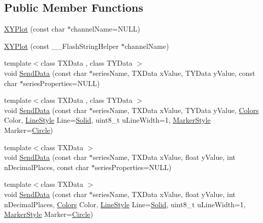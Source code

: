 \subsection*{Public Member Functions}
\begin{DoxyCompactItemize}
\item 
\hyperlink{class_x_y_plot_a2eb15ab7b978250fadb0c17641f3d559}{X\-Y\-Plot} (const char $\ast$channel\-Name=N\-U\-L\-L)
\item 
\hyperlink{class_x_y_plot_ac1da6343667a85e50927e6a7c0f8e8e0}{X\-Y\-Plot} (const \-\_\-\-\_\-\-Flash\-String\-Helper $\ast$channel\-Name)
\item 
{\footnotesize template$<$class T\-X\-Data , class T\-Y\-Data $>$ }\\void \hyperlink{class_x_y_plot_ad224fe41ae8cd8f1c226c826e577e9f7}{Send\-Data} (const char $\ast$series\-Name, T\-X\-Data x\-Value, T\-Y\-Data y\-Value, const char $\ast$series\-Properties=N\-U\-L\-L)
\item 
{\footnotesize template$<$class T\-X\-Data , class T\-Y\-Data $>$ }\\void \hyperlink{class_x_y_plot_aea1795e7bc4d61a10427c7a251f926b6}{Send\-Data} (const char $\ast$series\-Name, T\-X\-Data x\-Value, T\-Y\-Data y\-Value, \hyperlink{class_plot_af4d6704578791a812f3f78617adc7040}{Colors} Color, \hyperlink{class_plot_a05a5ea232f5115847a9861a9660205c7}{Line\-Style} Line=\hyperlink{class_plot_a05a5ea232f5115847a9861a9660205c7a4a144f2b97cc3762d40863bde0853f22}{Solid}, uint8\-\_\-t u\-Line\-Width=1, \hyperlink{class_plot_a888bde9c76bb38843a5ab09097cbeeab}{Marker\-Style} Marker=\hyperlink{class_plot_a888bde9c76bb38843a5ab09097cbeeaba9eb079a6c0fcf4d7125147671b071e2e}{Circle})
\item 
{\footnotesize template$<$class T\-X\-Data $>$ }\\void \hyperlink{class_x_y_plot_a7a7ae0fce5ebee29cb11fd5b858ed012}{Send\-Data} (const char $\ast$series\-Name, T\-X\-Data x\-Value, float y\-Value, int n\-Decimal\-Places, const char $\ast$series\-Properties=N\-U\-L\-L)
\item 
{\footnotesize template$<$class T\-X\-Data $>$ }\\void \hyperlink{class_x_y_plot_ab779ba9752cc633b55ea68b23d29d27f}{Send\-Data} (const char $\ast$series\-Name, T\-X\-Data x\-Value, float y\-Value, int n\-Decimal\-Places, \hyperlink{class_plot_af4d6704578791a812f3f78617adc7040}{Colors} Color, \hyperlink{class_plot_a05a5ea232f5115847a9861a9660205c7}{Line\-Style} Line=\hyperlink{class_plot_a05a5ea232f5115847a9861a9660205c7a4a144f2b97cc3762d40863bde0853f22}{Solid}, uint8\-\_\-t u\-Line\-Width=1, \hyperlink{class_plot_a888bde9c76bb38843a5ab09097cbeeab}{Marker\-Style} Marker=\hyperlink{class_plot_a888bde9c76bb38843a5ab09097cbeeaba9eb079a6c0fcf4d7125147671b071e2e}{Circle})

\end{DoxyCompactItemize}
